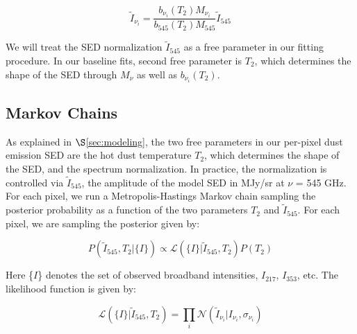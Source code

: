 \documentclass{emulateapj}
\begin{document}
\begin{equation}
\label{eqn:inten}
\tilde{I}_{\nu_i} = \frac{b_{\nu_i}(T_2)M_{\nu_i}}{b_{545}(T_2)M_{545}}\tilde{I}_{545}
\end{equation}

We will treat the SED normalization $\tilde{I}_{545}$ as a free parameter in
our fitting procedure. In our baseline fits, second free parameter is $T_2$, 
which determines the shape of the SED through $M_{\nu}$ as well as 
$b_{\nu_i}(T_2)$.




\subsection{Markov Chains}
As explained in $\S$\ref{sec:modeling}, the two free parameters in our 
per-pixel dust emission SED are the hot dust temperature $T_2$, which 
determines the shape of the SED, and the spectrum normalization. In practice,
the normalization is controlled via $\tilde{I}_{545}$, the amplitude of the 
model SED in MJy/sr at $\nu$ = 545 GHz. For each pixel, we run a 
Metropolis-Hastings Markov chain sampling the posterior probability as a 
function of the two parameters $T_2$ and $\tilde{I}_{545}$. For each pixel, we 
are sampling the posterior given by:


\begin{equation}
\label{eqn:post}
P(\tilde{I}_{545}, T_2|\{I\}) \propto \mathcal{L}(\{I\}|\tilde{I}_{545}, T_2)P(T_2)
\end{equation}

Here \{$I$\} denotes the set of observed broadband intensities, $I_{217}$, 
$I_{353}$, etc. The likelihood function is given by:

\begin{equation}
\mathcal{L}(\{I\}|\tilde{I}_{545}, T_2) = \displaystyle\prod\limits_{i}\mathcal{N}(\tilde{I}_{\nu_{i}}|I_{\nu_{i}}, \sigma_{\nu_i})
\end{equation}
\end{document}
